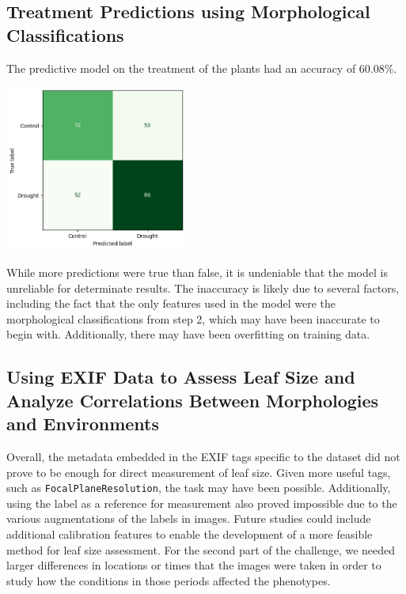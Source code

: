 \documentclass[final,5p,times,twocolumn,authoryear]{elsarticle}
\begin{document}
\subsection{Treatment Predictions using Morphological Classifications}
\label{step_3}

The predictive model on the treatment of the plants had an accuracy of 60.08\%. 

\begin{center}
    \includegraphics[width=0.45\textwidth]{images/treat_conf_matrix.png}
\end{center}

While more predictions were true than false, it is undeniable that the model is unreliable for determinate results. The inaccuracy is likely due to several factors, including the fact that the only features used in the model were the morphological classifications from step 2, which may have been inaccurate to begin with. Additionally, there may have been overfitting on training data.

\subsection{Using EXIF Data to Assess Leaf Size and Analyze Correlations Between Morphologies and Environments}
\label{step_4}

Overall, the metadata embedded in the EXIF tags specific to the dataset did not prove to be enough for direct measurement of leaf size. Given more useful tags, such as \verb|FocalPlaneResolution|, the task may have been possible. Additionally, using the label as a reference for measurement also proved impossible due to the various augmentations of the labels in images. Future studies could include additional calibration features to enable the development of a more feasible method for leaf size assessment. For the second part of the challenge, we needed larger differences in locations or times that the images were taken in order to study how the conditions in those periods affected the phenotypes.
\end{document}
